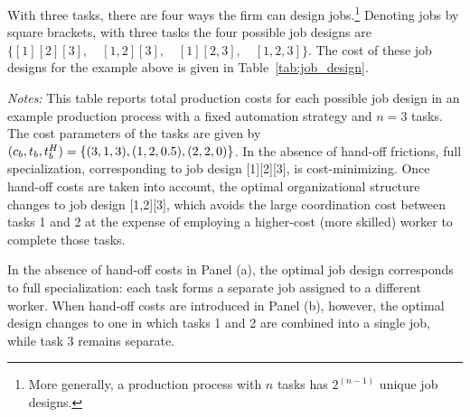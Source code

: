 With three tasks, there are four ways the firm can design jobs.\footnote{
More generally, a production process with $n$ tasks has $2^{(n-1)}$ unique job designs.
} 
Denoting jobs by square brackets, with three tasks the four possible job designs are 
$\{[1][2][3], \quad [1,2][3], \quad [1][2,3], \quad [1,2,3]\}$.
The cost of these job designs for the example above is given in Table~\ref{tab:job_design}.
\begin{table}[ht!]
    \caption{Role of Hand-off Costs in Organizational Structure}
    \begin{center}
    \hspace{-1.4cm}
    \label{tab:job_design}
    \end{center}
    \raggedright \footnotesize{\emph{Notes:} This table reports total production costs for each possible job design in an example production process with a fixed automation strategy and $n = 3$ tasks. 
    The cost parameters of the tasks are given by $(c_{b},t_{b},t^{H}_{b})=\{(3,1,3),(1,2,0.5),(2,2,0)\}$.
    In the absence of hand-off frictions, full specialization, corresponding to job design [1][2][3], is cost-minimizing. 
    Once hand-off costs are taken into account, the optimal organizational structure changes to job design [1,2][3], which avoids the large coordination cost between tasks 1 and 2 at the expense of employing a higher-cost (more skilled) worker to complete those tasks.
    }
\end{table}
In the absence of hand-off costs in Panel (a), the optimal job design corresponds to full specialization: each task forms a separate job assigned to a different worker.
When hand-off costs are introduced in Panel (b), however, the optimal design changes to one in which tasks 1 and 2 are combined into a single job, while task 3 remains separate.
